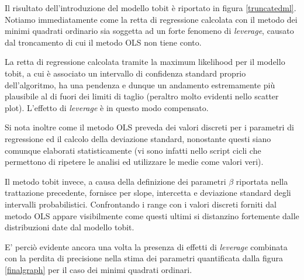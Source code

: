 \documentclass[12pt,openright,twoside,a4paper]{book}
\begin{document}
Il risultato dell'introduzione del modello tobit è riportato in figura \ref{truncatedml}.
Notiamo immediatamente come la retta di regressione calcolata con il metodo dei minimi quadrati ordinario sia soggetta ad un forte fenomeno di \textit{leverage}, causato dal troncamento di cui il metodo OLS non tiene conto.

La retta di regressione calcolata tramite la maximum likelihood per il modello tobit, a cui è associato un intervallo di confidenza standard proprio dell'algoritmo, ha una pendenza e dunque un andamento estremamente più plausibile al di fuori dei limiti di taglio (peraltro molto evidenti nello scatter plot). 
L'effetto di \textit{leverage} è in questo modo compensato.

Si nota inoltre come il metodo OLS preveda dei valori discreti per i parametri di regressione ed il calcolo della deviazione standard, nonostante questi siano comunque elaborati statisticamente (vi sono infatti nello script cicli che permettono di ripetere le analisi ed utilizzare le medie come valori veri).

Il metodo tobit invece, a causa della definizione dei parametri $\beta$ riportata nella trattazione precedente, fornisce per slope, intercetta e deviazione standard degli intervalli probabilistici.
Confrontando i range con i valori discreti forniti dal metodo OLS appare visibilmente come questi ultimi si distanzino fortemente dalle distribuzioni date dal modello tobit.

E' perciò evidente ancora una volta la presenza di effetti di \textit{leverage} combinata con la perdita di precisione nella stima dei parametri quantificata dalla figura \ref{finalgraph} per il caso dei minimi quadrati ordinari.
\end{document}

